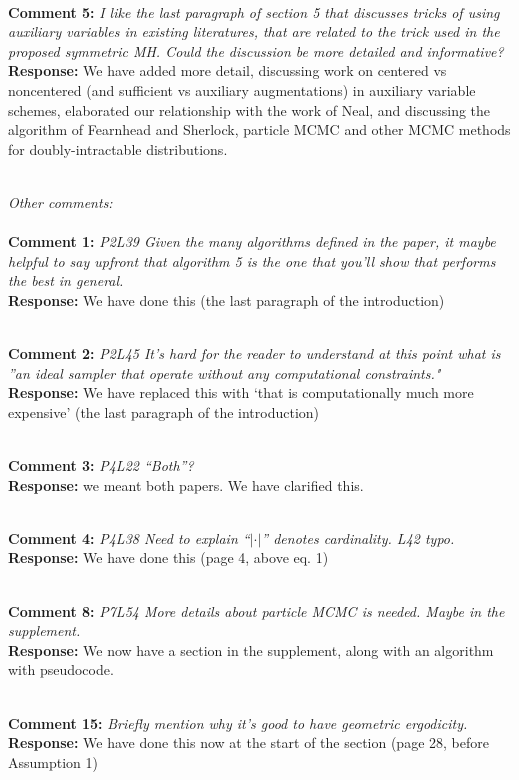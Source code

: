 \documentclass[11pt]{article}
\newcommand{\rev}[2]{\textbf{Comment #1: }\emph{#2}}
\newcommand{\resp}{\textbf{Response: }}
\begin{document}
~\\
\noindent \rev{5}{I like the last paragraph of section 5 that discusses tricks of using auxiliary variables in
existing literatures, that are related to the trick used in the proposed symmetric MH.
Could the discussion be more detailed and informative?
} \\
\resp{We have added more detail, discussing work on centered vs noncentered (and sufficient vs auxiliary augmentations) in auxiliary variable schemes, elaborated our relationship with the work of Neal, and discussing the algorithm of Fearnhead and Sherlock, particle MCMC and other MCMC methods for doubly-intractable distributions.}

~\\
{\emph{Other comments: }}\\~\\
\noindent \rev{1}{P2L39 Given the many algorithms defined in the paper, it maybe helpful to say upfront that algorithm 5 is the one that you’ll show that performs the best in general.}\\
\resp We have done this (the last paragraph of the introduction)

~\\
\noindent \rev{2}{P2L45 It’s hard for the reader to understand at this point what is ”an ideal sampler that operate without any computational constraints."}\\
\resp We have replaced this with `that is computationally much more expensive' (the last paragraph of the introduction)

~\\
\noindent \rev{3}{P4L22 “Both”?} \\
\resp{we meant both papers. We have clarified this.}

~\\
\noindent \rev{4}{P4L38 Need to explain “$| \cdot |$” denotes cardinality. L42 typo.} \\
\resp We have done this (page 4, above eq. 1)

~\\
\noindent \rev{8}{P7L54 More details about particle MCMC is needed. Maybe in the supplement.} \\
\resp We now have a section in the supplement, along with an algorithm with pseudocode.

~\\
\noindent \rev{15}{Briefly mention why it’s good to have geometric ergodicity.} \\
\resp We have done this now at the start of the section (page 28, before Assumption 1) 
\end{document}
